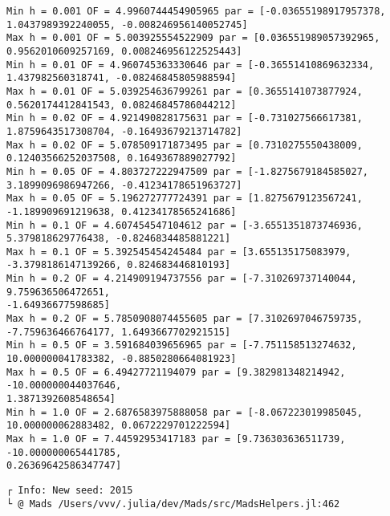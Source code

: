 \documentclass[11pt]{article}
\begin{document}
    \begin{Verbatim}[commandchars=\\\{\}]
Min h = 0.001 OF = 4.9960744454905965 par = [-0.03655198917957378,
1.0437989392240055, -0.008246956140052745]
Max h = 0.001 OF = 5.003925554522909 par = [0.036551989057392965,
0.9562010609257169, 0.008246956122525443]
Min h = 0.01 OF = 4.960745363330646 par = [-0.36551410869632334,
1.437982560318741, -0.08246845805988594]
Max h = 0.01 OF = 5.039254636799261 par = [0.3655141073877924,
0.5620174412841543, 0.08246845786044212]
Min h = 0.02 OF = 4.921490828175631 par = [-0.731027566617381,
1.8759643517308704, -0.16493679213714782]
Max h = 0.02 OF = 5.078509171873495 par = [0.7310275550438009,
0.12403566252037508, 0.1649367889027792]
Min h = 0.05 OF = 4.803727222947509 par = [-1.8275679184585027,
3.1899096986947266, -0.41234178651963727]
Max h = 0.05 OF = 5.196272777724391 par = [1.8275679123567241,
-1.189909691219638, 0.41234178565241686]
Min h = 0.1 OF = 4.607454547104612 par = [-3.6551351873746936,
5.379818629776438, -0.8246834485881221]
Max h = 0.1 OF = 5.392545454245484 par = [3.655135175083979,
-3.3798186147139266, 0.824683446810193]
Min h = 0.2 OF = 4.214909194737556 par = [-7.310269737140044, 9.759636506472651,
-1.64936677598685]
Max h = 0.2 OF = 5.7850908074455605 par = [7.3102697046759735,
-7.759636466764177, 1.6493667702921515]
Min h = 0.5 OF = 3.591684039656965 par = [-7.751158513274632,
10.000000041783382, -0.8850280664081923]
Max h = 0.5 OF = 6.49427721194079 par = [9.382981348214942, -10.000000044037646,
1.3871392608548654]
Min h = 1.0 OF = 2.6876583975888058 par = [-8.067223019985045,
10.000000062883482, 0.0672229701222594]
Max h = 1.0 OF = 7.44592953417183 par = [9.736303636511739, -10.000000065441785,
0.26369642586347747]
    \end{Verbatim}

    \begin{Verbatim}[commandchars=\\\{\}]
┌ Info: New seed: 2015
└ @ Mads /Users/vvv/.julia/dev/Mads/src/MadsHelpers.jl:462
    \end{Verbatim}
\end{document}
